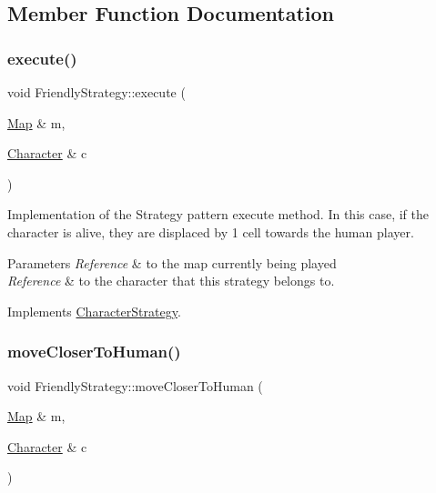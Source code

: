 \subsection{Member Function Documentation}
\hypertarget{class_friendly_strategy_a0d09aaf92d63050e081d0509683d073d}{}\label{class_friendly_strategy_a0d09aaf92d63050e081d0509683d073d} 
\subsubsection{\texorpdfstring{execute()}{execute()}}
{\footnotesize\ttfamily void Friendly\+Strategy\+::execute (\begin{DoxyParamCaption}\item[{\hyperlink{class_map}{Map} \&}]{m,  }\item[{\hyperlink{class_character}{Character} \&}]{c }\end{DoxyParamCaption})\hspace{0.3cm}{\ttfamily [virtual]}}

Implementation of the Strategy pattern execute method. In this case, if the character is alive, they are displaced by 1 cell towards the human player. 
\begin{DoxyParams}{Parameters}
{\em Reference} & to the map currently being played \\
\hline
{\em Reference} & to the character that this strategy belongs to. \\
\hline
\end{DoxyParams}


Implements \hyperlink{class_character_strategy}{Character\+Strategy}.

\hypertarget{class_friendly_strategy_a0fe250c462da3ba3bfb3b4f7ea73a4d9}{}\label{class_friendly_strategy_a0fe250c462da3ba3bfb3b4f7ea73a4d9} 
\subsubsection{\texorpdfstring{move\+Closer\+To\+Human()}{moveCloserToHuman()}}
{\footnotesize\ttfamily void Friendly\+Strategy\+::move\+Closer\+To\+Human (\begin{DoxyParamCaption}\item[{\hyperlink{class_map}{Map} \&}]{m,  }\item[{\hyperlink{class_character}{Character} \&}]{c }\end{DoxyParamCaption})}

